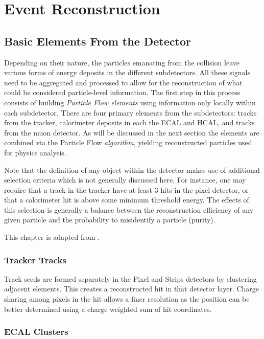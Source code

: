 \chapter{Event Reconstruction}
\label{chap:eventreco}

\section{Basic Elements From the Detector} 

Depending on their nature, the particles emanating from the collision leave various forms of energy deposits in the different subdetectors. All these signals need to be aggregated and processed to allow for the reconstruction of what could be considered particle-level information. The first step in this process consists of building \textit{Particle Flow elements} using information only locally within each subdetector. There are four primary elements from the subdetectors: tracks from the tracker, calorimeter deposits in each the ECAL and HCAL, and tracks from the muon detector. As will be discussed in the next section the elements are combined via the Particle Flow \textit{algorithm}, yielding reconstructed particles used for physics analysis.

Note that the definition of any object within the detector makes use of additional selection criteria which is not generally discussed here. For instance, one may require that a track in the tracker have at least 3 hits in the pixel detector, or that a calorimeter hit is above some minimum threshold energy. The effects of this selection is generally a balance between the reconstruction efficiency of any given particle and the probability to misidentify a particle (purity).

This chapter is adapted from \cite{CMS-PRF-14-001}.

\subsection{Tracker Tracks}

Track seeds are formed separately in the Pixel and Strips detectors by clustering adjacent elements. This creates a reconstructed hit in that detector layer. Charge sharing among pixels in the hit allows a finer resolution as the position can be better determined using a charge weighted sum of hit coordinates.\cite{trackerreco}

\subsection{ECAL Clusters}

